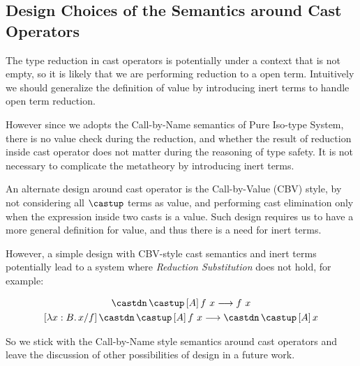 \begin{comment}
\begin{equation*}
    F : [[int]] \rightarrow [[*]],\, A : [[*]],\, \rulehl{a : A} \vdash F ~ ([[(bind x : A. lambda y : int. y)]]~ 42) : [[*]]
\end{equation*}

For the time being, we think the addition of the premise in \rref{s-forall-r} and
the addition of \rref{s-forall} do not complicate the metatheory as much, so
we leave the further exploration of the issue above in a future work.
\end{comment}

\subsection{Design Choices of the Semantics around Cast Operators}
\label{sec:cast-design}

The type reduction in cast operators is potentially under a context that
is not empty, so it is likely that we are performing reduction to a open term.
Intuitively we should generalize the definition of value by introducing inert
terms\cite{yang2017unifying} to handle open term reduction.

However since we adopts the Call-by-Name semantics of Pure Iso-type System\cite{yang2019pure},
there is no value check during the reduction, and whether the result of reduction
inside cast operator does not matter during the reasoning of type safety. It is
not necessary to complicate the metatheory by introducing inert terms.

An alternate design around cast operator is the Call-by-Value (CBV) style\cite{yang2019pure},
by not considering all $\castup$ terms as value, and performing cast elimination only
when the expression inside two casts is a value. Such design requires us to
have a more general definition for value, and thus there is a need for inert terms.

However, a simple design with CBV-style cast semantics and inert terms
potentially lead to a system where \emph{Reduction Substitution} does not hold,
for example:

\begin{gather*}
    \castdn \, \castup \, [A] \, f ~ x \longrightarrow f ~ x \\
    [\lambda x : B. \, x / f] \, \castdn \, \castup \, [A] \, f ~ x \longrightarrow \castdn \, \castup \, [A] \, x
\end{gather*}

So we stick with the Call-by-Name style semantics around cast operators and
leave the discussion of other possibilities of design in a future work.

